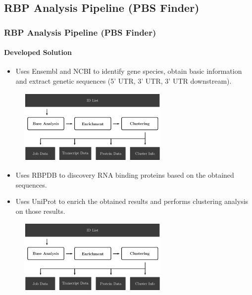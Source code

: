 \documentclass{beamer}
\begin{document}
\subsection{RBP Analysis Pipeline (PBS Finder)}
\begin{frame}[allowframebreaks]
  \frametitle{RBP Analysis Pipeline (PBS Finder)}
  \framesubtitle{Developed Solution}

\begin{itemize}
\item
Uses Ensembl and NCBI to identify gene species, obtain basic information and
extract genetic sequences (5' UTR, 3' UTR, 3' UTR downstream).
\end{itemize}\vspace{0.23cm}

\begin{figure}
  \centering
  \includegraphics[width=0.65\textwidth]{workflow2}
\end{figure}

\framebreak

\begin{itemize}
\item
Uses RBPDB to discovery RNA binding proteins based on the obtained sequences.

\item
Uses UniProt to enrich the obtained results and performs clustering analysis on
those results.
\end{itemize}

\begin{figure}
  \centering
  \includegraphics[width=0.65\textwidth]{workflow2}
\end{figure}


\end{frame}
\end{document}
